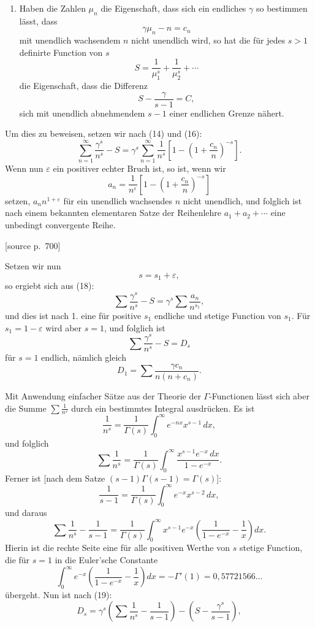 \documentclass[11pt]{article}
\newcommand{\srcpage}[1]{\par\medskip\noindent\textsf{[source p.~#1]}\par\smallskip}
\begin{document}
\begin{enumerate}[label=\textbf{\arabic*.},leftmargin=2.2em,start=6]
\item Haben die Zahlen $\mu_n$ die Eigenschaft, dass sich ein endliches $\gamma$ so bestimmen lässt, dass
\begin{equation}
\gamma\mu_n-n=c_n
\tag{15}
\end{equation}
mit unendlich wachsendem $n$ nicht unendlich wird, so hat die für jedes $s>1$ definirte Function von $s$
\begin{equation}
S=\frac1{\mu_1^s}+\frac1{\mu_2^s}+\cdots
\tag{16}
\end{equation}
die Eigenschaft, dass die Differenz
\begin{equation}
S-\frac{\gamma}{s-1}=C,
\tag{17}
\end{equation}
sich mit unendlich abnehmendem $s-1$ einer endlichen Grenze nähert.
\end{enumerate}

Um dies zu beweisen, setzen wir nach (14) und (16):
\begin{equation}
\sum_{n=1}^{\infty}\frac{\gamma^s}{n^s}-S
=\gamma^s\sum_{n=1}^{\infty}\frac1{n^s}
\left[1-\left(1+\frac{c_n}{n}\right)^{-s}\right].
\tag{18}
\end{equation}
Wenn nun $\varepsilon$ ein positiver echter Bruch ist, so ist, wenn wir
\[
a_n=\frac1{n^\varepsilon}\left[1-\left(1+\frac{c_n}{n}\right)^{-s}\right]
\]
setzen, $a_n n^{1+\varepsilon}$ für ein unendlich wachsendes $n$ nicht unendlich, und folglich ist nach einem bekannten elementaren Satze der Reihenlehre $a_1+a_2+\cdots$ eine unbedingt convergente Reihe.

\srcpage{700}
Setzen wir nun
\[
s=s_1+\varepsilon,
\]
so ergiebt sich aus (18):
\[
\sum\frac{\gamma^s}{n^s}-S=\gamma^s\sum\frac{a_n}{n^{s_1}},
\]
und dies ist nach 1. eine für positive $s_1$ endliche und stetige Function von $s_1$. Für $s_1=1-\varepsilon$ wird aber $s=1$, und folglich ist
\begin{equation}
\sum\frac{\gamma^s}{n^s}-S=D_s
\tag{19}
\end{equation}
für $s=1$ endlich, nämlich gleich
\[
D_1=\sum\frac{\gamma c_n}{n(n+c_n)}.
\]

Mit Anwendung einfacher Sätze aus der Theorie der $\Gamma$-Functionen lässt sich aber die Summe $\sum\frac1{n^s}$ durch ein bestimmtes Integral ausdrücken. Es ist
\[
\frac1{n^s}=\frac1{\Gamma(s)}\int_0^\infty e^{-nx}x^{s-1}\,dx,
\]
und folglich
\[
\sum\frac1{n^s}=\frac1{\Gamma(s)}\int_0^\infty \frac{x^{s-1}e^{-x}\,dx}{1-e^{-x}}.
\]
Ferner ist [nach dem Satze $(s-1)\Gamma(s-1)=\Gamma(s)$]:
\[
\frac1{s-1}=\frac1{\Gamma(s)}\int_0^\infty e^{-x}x^{s-2}\,dx,
\]
und daraus
\[
\sum\frac1{n^s}-\frac1{s-1}
=\frac1{\Gamma(s)}\int_0^\infty x^{s-1}e^{-x}
\left(\frac1{1-e^{-x}}-\frac1x\right)dx.
\]
Hierin ist die rechte Seite eine für alle positiven Werthe von $s$ stetige Function, die für $s=1$ in die Euler'sche Constante
\[
\int_0^\infty e^{-x}\left(\frac1{1-e^{-x}}-\frac1x\right)dx
=-\Gamma'(1)=0{,}57721566\ldots
\]
übergeht. Nun ist nach (19):
\[
D_s=\gamma^s\left(\sum\frac1{n^s}-\frac1{s-1}\right)
-\left(S-\frac{\gamma^s}{s-1}\right),
\]
\end{document}
